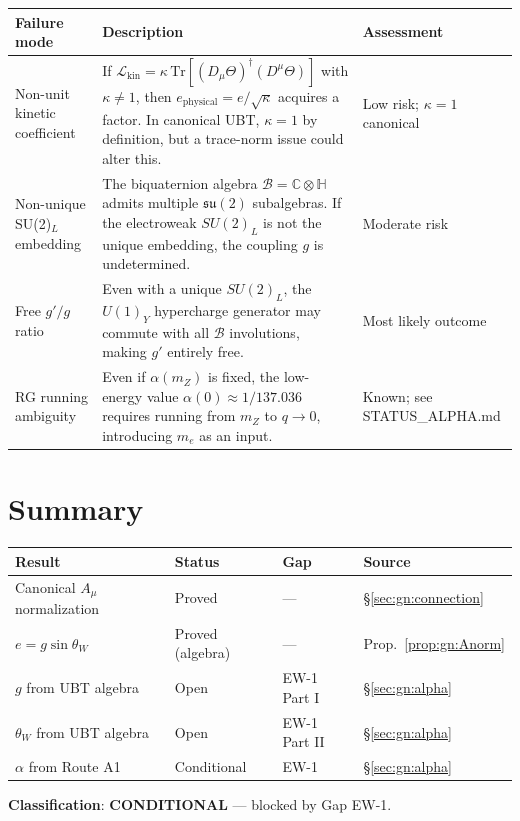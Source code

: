 \documentclass[12pt,a4paper]{article}
\theoremstyle{definition}
\theoremstyle{remark}
\begin{document}
\begin{longtable}{p{3.5cm} p{7cm} p{3cm}}
\toprule
\textbf{Failure mode} & \textbf{Description} & \textbf{Assessment} \\
\midrule
Non-unit kinetic coefficient &
  If $\mathcal{L}_{\mathrm{kin}} = \kappa\,\mathrm{Tr}[(D_\mu\Theta)^\dagger(D^\mu\Theta)]$
  with $\kappa \neq 1$, then $e_{\mathrm{physical}} = e/\sqrt{\kappa}$ acquires a
  factor.  In canonical UBT, $\kappa = 1$ by definition, but a trace-norm
  issue could alter this. &
  Low risk; $\kappa=1$ canonical \\
\midrule
Non-unique SU(2)$_L$ embedding &
  The biquaternion algebra $\mathcal{B} = \mathbb{C}\otimes\mathbb{H}$ admits multiple
  $\mathfrak{su}(2)$ subalgebras.  If the electroweak $SU(2)_L$ is not the unique
  embedding, the coupling $g$ is undetermined. &
  Moderate risk \\
\midrule
Free $g'/g$ ratio &
  Even with a unique $SU(2)_L$, the $U(1)_Y$ hypercharge generator may commute
  with all $\mathcal{B}$ involutions, making $g'$ entirely free. &
  Most likely outcome \\
\midrule
RG running ambiguity &
  Even if $\alpha(m_Z)$ is fixed, the low-energy value $\alpha(0) \approx 1/137.036$
  requires running from $m_Z$ to $q\to0$, introducing $m_e$ as an input. &
  Known; see STATUS\_ALPHA.md \\
\bottomrule
\end{longtable}

\section{Summary}
\label{sec:gn:summary}

\begin{center}
\begin{tabular}{llll}
\toprule
Result & Status & Gap & Source \\
\midrule
Canonical $A_\mu$ normalization & Proved & — & \S\ref{sec:gn:connection} \\
$e = g\sin\theta_W$ & Proved (algebra) & — & Prop.~\ref{prop:gn:Anorm} \\
$g$ from UBT algebra & Open & EW-1 Part I & \S\ref{sec:gn:alpha} \\
$\theta_W$ from UBT algebra & Open & EW-1 Part II & \S\ref{sec:gn:alpha} \\
$\alpha$ from Route A1 & Conditional & EW-1 & \S\ref{sec:gn:alpha} \\
\bottomrule
\end{tabular}
\end{center}

\noindent\textbf{Classification}: \textbf{CONDITIONAL} — blocked by Gap EW-1.

\ifdefined\INCLUDEMODE
\else
  
\end{document}
